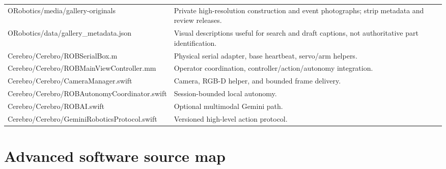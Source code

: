 \documentclass[10pt,openany]{book}
\begin{document}
\begin{tabularx}{\textwidth}{>{\ttfamily\scriptsize}p{2.65in} X}
ORobotics/media/gallery-originals & Private high-resolution construction and event photographs; strip metadata and review releases.\\
ORobotics/data/gallery\_metadata.json & Visual descriptions useful for search and draft captions, not authoritative part identification.\\
Cerebro/Cerebro/ROBSerialBox.m & Physical serial adapter, base heartbeat, servo/arm helpers.\\
Cerebro/Cerebro/ROBMainViewController.mm & Operator coordination, controller/action/autonomy integration.\\
Cerebro/Cerebro/CameraManager.swift & Camera, RGB-D helper, and bounded frame delivery.\\
Cerebro/Cerebro/ROBAutonomyCoordinator.swift & Session-bounded local autonomy.\\
Cerebro/Cerebro/ROBAI.swift & Optional multimodal Gemini path.\\
Cerebro/Cerebro/GeminiRoboticsProtocol.swift & Versioned high-level action protocol.\\
\bottomrule
\end{tabularx}

\section*{Advanced software source map}
\end{document}

